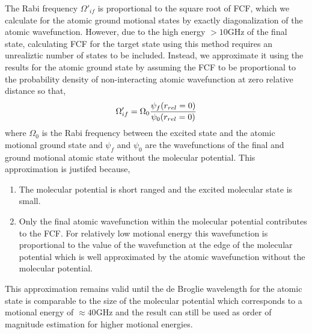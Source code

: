 The Rabi frequency $\Omega'_{if}$ is proportional to the square root of FCF,
which we calculate for the atomic ground motional states by exactly diagonalization
of the atomic wavefunction.
However, due to the high energy $>10\mathrm{GHz}$ of the final state,
calculating FCF for the target state using this method requires an unrealiztic number of
states to be included.
Instead, we approximate it using the results for the atomic ground state
by assuming the FCF to be proportional to the probability density of non-interacting
atomic wavefunction at zero relative distance so that,
\[
  \Omega'_{if}=\Omega_0\frac{\psi_f{\left({r_{rel}=0}\right)}}{\psi_0{\left({r_{rel}=0}\right)}}
\]
where $\Omega_0$ is the Rabi frequency between the excited state and
the atomic motional ground state and $\psi_f$ and $\psi_0$ are the
wavefunctions of the final and ground motional atomic state without the molecular potential.
This approximation is justifed because,
\begin{enumerate}
\item The molecular potential is short ranged and the excited molecular state is small.
\item Only the final atomic wavefunction within the molecular potential contributes to the FCF.
  For relatively low motional energy
  this wavefunction is proportional to the value of the wavefunction at
  the edge of the molecular potential which is well approximated by
  the atomic wavefunction without the molecular potential.
\end{enumerate}
This approximation remains valid until the de Broglie wavelength for the atomic state
is comparable to the size of the molecular potential which corresponds to
a motional energy of $\approx40\mathrm{GHz}$
and the result can still be used as order of magnitude estimation for higher motional energies.

